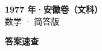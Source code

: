 \documentclass[zihao=-4, a4paper]{ctexart}
\begin{document}
\begin{center}
  {\Large\bfseries 1977 年·安徽卷（文科）}\\[4pt]
  {\large 数学 · 简答版}
\end{center}
\medskip
{}

\clearpage
{}
\begin{center}{\Large\bfseries 答案速查}\end{center}
\medskip

\end{document}
